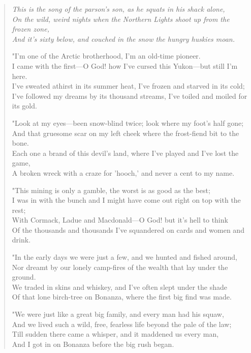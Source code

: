 

\begin{verse}
\textit{
This is the song of the parson's son, as he squats in his shack alone,\\
On the wild, weird nights when the Northern Lights shoot up from the frozen zone,\\
And it's sixty below, and couched in the snow the hungry huskies moan.
}

"I'm one of the Arctic brotherhood, I'm an old-time pioneer.\\
I came with the first—O God! how I've cursed this Yukon—but still I'm here.\\
I've sweated athirst in its summer heat, I've frozen and starved in its cold;\\
I've followed my dreams by its thousand streams, I've toiled and moiled for its gold.

"Look at my eyes—been snow-blind twice; look where my foot's half gone;\\
And that gruesome scar on my left cheek where the frost-fiend bit to the bone.\\
Each one a brand of this devil's land, where I've played and I've lost the game,\\
A broken wreck with a craze for 'hooch,' and never a cent to my name.

"This mining is only a gamble, the worst is as good as the best;\\
I was in with the bunch and I might have come out right on top with the rest;\\
With Cormack, Ladue and Macdonald—O God! but it's hell to think\\
Of the thousands and thousands I've squandered on cards and women and drink.

"In the early days we were just a few, and we hunted and fished around,\\
Nor dreamt by our lonely camp-fires of the wealth that lay under the ground.\\
We traded in skins and whiskey, and I've often slept under the shade\\
Of that lone birch-tree on Bonanza, where the first big find was made.

"We were just like a great big family, and every man had his squaw,\\
And we lived such a wild, free, fearless life beyond the pale of the law;\\
Till sudden there came a whisper, and it maddened us every man,\\
And I got in on Bonanza before the big rush began.


\end{verse}
